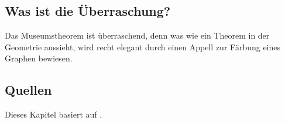 \subsection*{Was ist die Überraschung?}
Das Museumstheorem ist überraschend, denn was wie ein Theorem in der Geometrie aussieht, wird recht elegant durch einen Appell zur Färbung eines Graphen bewiesen.

\subsection*{Quellen}

Dieses Kapitel basiert auf \cite[Chap.~39]{thebook}.
